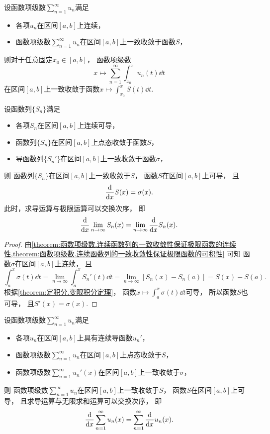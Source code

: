 \begin{proposition}
设函数项级数\(\sum_{n=1}^\infty u_n\)满足\begin{itemize}
	\item 各项\(u_n\)在区间\([a,b]\)上连续，
	\item 函数项级数\(\sum_{n=1}^\infty u_n\)在区间\([a,b]\)上一致收敛于函数\(S\)，
\end{itemize}
则对于任意固定\(x_0\in[a,b]\)，
函数项级数\[
	x \mapsto \sum_{n=1}^\infty \int_{x_0}^x u_n(t) \dd{t}
\]在区间\([a,b]\)上一致收敛于函数\(x \mapsto \int_{x_0}^x S(t) \dd{t}\).
\end{proposition}

\begin{theorem}\label{theorem:函数项级数.连续可导函数列的点态收敛性及其导函数列的一致收敛性保证极限函数的可微性}
设函数列\(\{S_n\}\)满足\begin{itemize}
	\item 各项\(S_n\)在区间\([a,b]\)上连续可导，
	\item 函数列\(\{S_n\}\)在区间\([a,b]\)上点态收敛于函数\(S\)，
	\item 导函数列\(\{S_n'\}\)在区间\([a,b]\)上一致收敛于函数\(\sigma\)，
\end{itemize}
则
函数列\(\{S_n\}\)在区间\([a,b]\)上一致收敛于\(S\)，
函数\(S\)在区间\([a,b]\)上可导，
且\[
	\dv{x} S(x) = \sigma(x).
\]
此时，求导运算与极限运算可以交换次序，
即\[
	\dv{x} \lim_{n\to\infty} S_n(x)
	= \lim_{n\to\infty} \dv{x} S_n(x).
\]
\begin{proof}
由\cref{theorem:函数项级数.连续函数列的一致收敛性保证极限函数的连续性,theorem:函数项级数.连续函数列的一致收敛性保证极限函数的可积性} 可知
函数\(\sigma\)在区间\([a,b]\)上连续，
且\[
	\int_a^x \sigma(t) \dd{t}
	= \lim_{n\to\infty} \int_a^x S_n'(t) \dd{t}
	= \lim_{n\to\infty} [S_n(x) - S_n(a)]
	= S(x) - S(a).
\]
根据\cref{theorem:定积分.变限积分定理}，
函数\(x \mapsto \int_a^x \sigma(t) \dd{t}\)可导，
所以函数\(S\)也可导，
且\(S'(x) = \sigma(x)\).
\end{proof}
\end{theorem}
\begin{theorem}
设函数项级数\(\sum_{n=1}^\infty u_n\)满足\begin{itemize}
	\item 各项\(u_n\)在区间\([a,b]\)上具有连续导函数\(u_n'\)，
	\item 函数项级数\(\sum_{n=1}^\infty u_n\)在区间\([a,b]\)上点态收敛于\(S\)，
	\item 函数项级数\(\sum_{n=1}^\infty u_n'(x)\)在区间\([a,b]\)上一致收敛于\(\sigma\)，
\end{itemize}
则
函数项级数\(\sum_{n=1}^\infty u_n\)在区间\([a,b]\)上一致收敛于\(S\)，
函数\(S\)在区间\([a,b]\)上可导，
且求导运算与无限求和运算可以交换次序，
即\[
	\dv{x} \sum_{n=1}^\infty u_n(x)
	= \sum_{n=1}^\infty \dv{x} u_n(x).
\]
\end{theorem}
